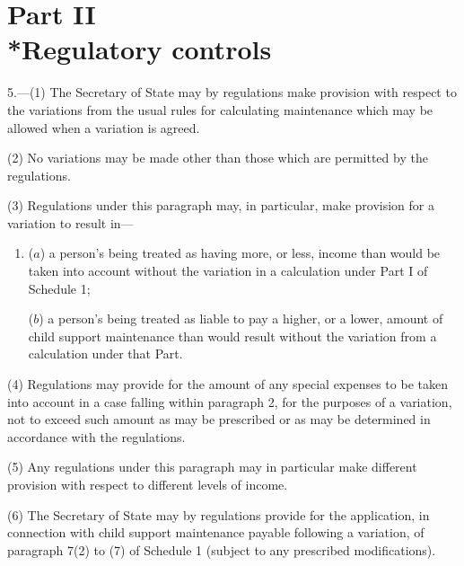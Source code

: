 \documentclass[12pt,a4paper]{article}
\begin{document}
{\section[Part II --- Regulatory controls]{Part II\\*Regulatory controls}

5.—(1) The Secretary of State may by regulations make provision with respect
to the variations from the usual rules for calculating maintenance which may be
allowed when a variation is agreed.

(2)
No variations may be made other than those which are permitted by the regulations.

(3)
Regulations under this paragraph may, in particular, make provision for a variation to result in---
\begin{enumerate}\item[]
($a$) a person’s being treated as having more, or less, income than would
be taken into account without the variation in a calculation under
Part I of Schedule 1;

($b$) a person’s being treated as liable to pay a higher, or a lower, amount of
child support maintenance than would result without the variation from a
calculation under that Part.
\end{enumerate}

(4)
Regulations may provide for the amount of any special expenses to be taken into account in a case falling within paragraph 2, for the purposes of a variation, not to exceed such amount as may be prescribed or as may be determined in accordance with the regulations.

(5)
Any regulations under this paragraph may in particular make different provision with respect to different levels of income.

(6)
The Secretary of State may by regulations provide for the application, in connection with child support maintenance payable following a variation, of paragraph 7(2) to (7) of Schedule 1 (subject to any prescribed modifications).


}
\end{document}
